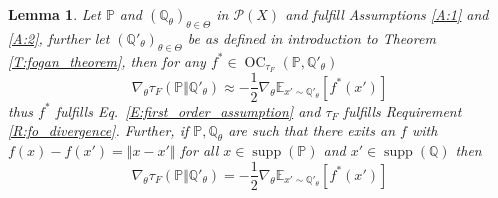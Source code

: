 \documentclass{article}
\DeclareMathOperator{\supp}{supp}
\DeclareMathOperator{\oc}{OC}
\newtheorem{lemma}{Lemma}
\begin{document}
\begin{lemma}\label{L:first_order}
 Let $\mathbb P$ and $(\mathbb Q_\theta)_{\theta\in\Theta}$ in $\mathcal P(X)$ and fulfill Assumptions \ref{A:1} and \ref{A:2},
 further let $(\mathbb Q'_\theta)_{\theta\in\Theta}$ be as defined in introduction to Theorem \ref{T:fogan_theorem},
 then for any $f^*\in\oc_{\tau_F}(\mathbb P,\mathbb Q'_\theta)$
 \[\nabla_\theta\tau_F(\mathbb P\Vert\mathbb Q'_\theta)\approx-\frac{1}{2}\nabla_\theta\mathbb E_{x'\sim\mathbb Q'_\theta}[f^*(x')]\]
 thus $f^*$ fulfills Eq.\ \ref{E:first_order_assumption} and $\tau_F$ fulfills Requirement \ref{R:fo_divergence}.
 Further, if $\mathbb P,\mathbb Q_\theta$ are such that there exits an $f$ with $f(x)-f(x')=\Vert x-x'\Vert$ for all $x\in\supp(\mathbb P)$
 and $x'\in\supp(\mathbb Q)$ then
 \[\nabla_\theta\tau_F(\mathbb P\Vert\mathbb Q'_\theta)=-\frac{1}{2}\nabla_\theta\mathbb E_{x'\sim\mathbb Q'_\theta}[f^*(x')]\]
\end{lemma}
\end{document}

